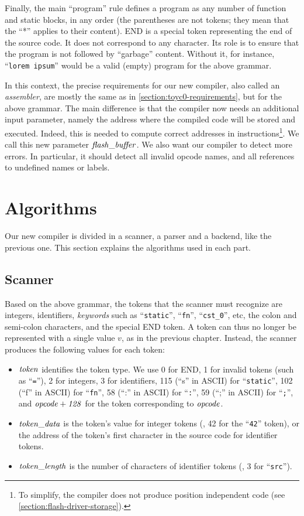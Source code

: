 Finally, the main ``program'' rule defines a program as any number of function
and static blocks, in any order (the parentheses are not tokens; they mean
that the ``*'' applies to their content). END is a special token representing
the end of the source code. It does not correspond to any character. Its role
is to ensure that the program is not followed by ``garbage'' content. Without
it, for instance, ``{\tt lorem ipsum}'' would be a valid (empty) program for
the above grammar.

In this context, the precise requirements for our new compiler, also called an
{\em assembler}, are mostly the same as in \cref{section:toyc0-requirements},
but for the above grammar. The main difference is that the compiler now needs
an additional input parameter, namely the address where the compiled code will
be stored and executed. Indeed, this is needed to compute correct addresses in
 instructions\footnote{To simplify, the compiler does not produce
position independent code (see \cref{section:flash-driver-storage}).}. We call
this new parameter $\it{flash\_buffer}$. We also want our compiler to detect
more errors. In particular, it should detect all invalid opcode names, and all
references to undefined names or labels.

\section{Algorithms}

Our new compiler is divided in a scanner, a parser and a backend, like the
previous one. This section explains the algorithms used in each part.

\subsection{Scanner}

Based on the above grammar, the tokens that the scanner must recognize are
integers, identifiers, {\em keywords} such as ``{\tt static}'', ``{\tt fn}'',
``{\tt cst\_0}'', etc, the colon and semi-colon characters, and the special END
token. A token can thus no longer be represented with a single value $v$, as in
the previous chapter. Instead, the scanner produces the following values for
each token:
\begin{itemize}
\item $\it{token}$ identifies the token type. We use 0 for END, 1 for invalid
tokens (such as ``{\tt =}''), 2 for integers, 3 for identifiers, 115 (``s'' in
ASCII) for ``{\tt static}'', 102 (``f'' in ASCII) for ``{\tt fn}'', 58 (``:''
in ASCII) for ``{\tt :}'', 59 (``;'' in ASCII) for ``{\tt ;}'', and
$\it{opcode}+128$ for the token corresponding to $\it{opcode}$.

\item $\it{token\_data}$ is the token's value for integer tokens (\eg, 42 for
the ``{\tt 42}'' token), or the address of the token's first character in the
source code for identifier tokens.

\item $\it{token\_length}$ is the number of characters of identifier tokens
(\eg, 3 for ``{\tt src}'').
\end{itemize}


